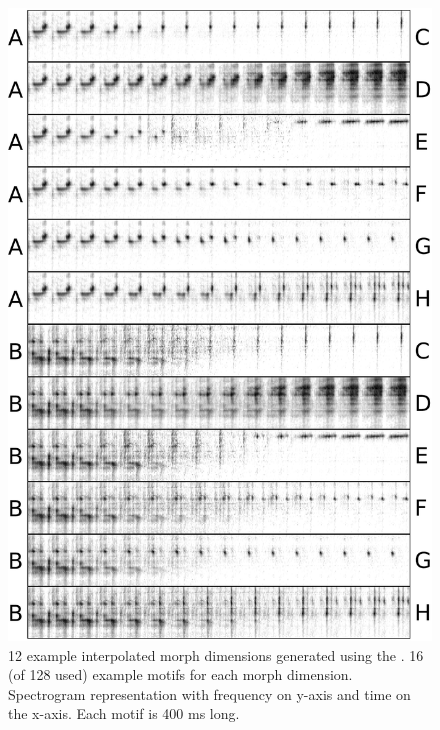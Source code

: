 \begin{figure}[tbp] 
  \centering
  \includegraphics[height=.8\textheight]{figures/supplemental/sfig01a-all-morphs-1.pdf}
  \caption[Generated morph dimensions 1/2]
{12 example interpolated morph dimensions generated using the \DBN. 16 (of 128 used) example motifs for each morph dimension. Spectrogram representation with frequency on y-axis and time on the x-axis. Each motif is 400 ms long.
}
  \label{fig:morphs1}
\end{figure}